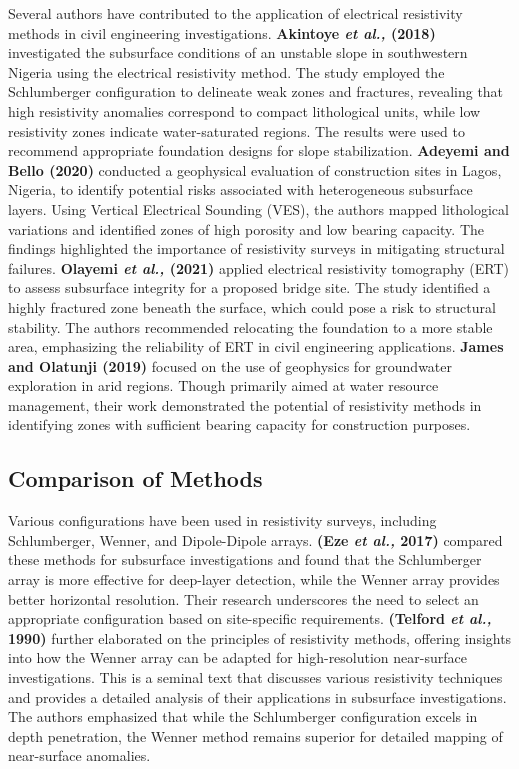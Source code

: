 \documentclass[12pt,a4paper]{report}
\begin{document}
Several authors have contributed to the application of electrical resistivity methods in civil engineering investigations. \textbf{Akintoye \textit{et al.,} (2018)} investigated the subsurface conditions of an unstable slope in southwestern Nigeria using the electrical resistivity method. The study employed the Schlumberger configuration to delineate weak zones and fractures, revealing that high resistivity anomalies correspond to compact lithological units, while low resistivity zones indicate water-saturated regions. The results were used to recommend appropriate foundation designs for slope stabilization. \textbf{Adeyemi and Bello (2020)} conducted a geophysical evaluation of construction sites in Lagos, Nigeria, to identify potential risks associated with heterogeneous subsurface layers. Using Vertical Electrical Sounding (VES), the authors mapped lithological variations and identified zones of high porosity and low bearing capacity. The findings highlighted the importance of resistivity surveys in mitigating structural failures. \textbf{Olayemi \textit{et al.,} (2021)} applied electrical resistivity tomography (ERT) to assess subsurface integrity for a proposed bridge site. The study identified a highly fractured zone beneath the surface, which could pose a risk to structural stability. The authors recommended relocating the foundation to a more stable area, emphasizing the reliability of ERT in civil engineering applications. \textbf{James and Olatunji (2019)} focused on the use of geophysics for groundwater exploration in arid regions. Though primarily aimed at water resource management, their work demonstrated the potential of resistivity methods in identifying zones with sufficient bearing capacity for construction purposes.

\subsection{Comparison of Methods}
Various configurations have been used in resistivity surveys, including Schlumberger, Wenner, and Dipole-Dipole arrays. \textbf{(Eze \textit{et al.,} 2017)} compared these methods for subsurface investigations and found that the Schlumberger array is more effective for deep-layer detection, while the Wenner array provides better horizontal resolution. Their research underscores the need to select an appropriate configuration based on site-specific requirements. \textbf{(Telford \textit{et al.,} 1990)} further elaborated on the principles of resistivity methods, offering insights into how the Wenner array can be adapted for high-resolution near-surface investigations. This is a seminal text that discusses various resistivity techniques and provides a detailed analysis of their applications in subsurface investigations. The authors emphasized that while the Schlumberger configuration excels in depth penetration, the Wenner method remains superior for detailed mapping of near-surface anomalies.
\end{document}
